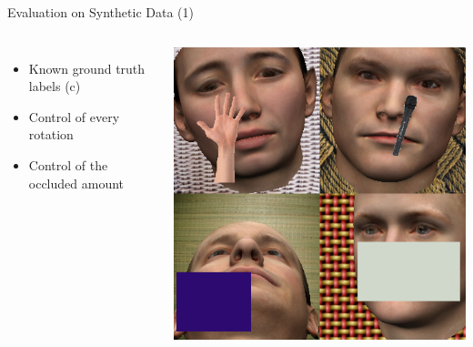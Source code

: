 \documentclass{beamer}
\begin{document}
\begin{frame}[c]{Evaluation on Synthetic Data (1)}
	\begin{columns}
		\begin{itemize}
			\item Known ground truth labels (c)
			\item Control of every rotation
			\item Control of the occluded amount
		\end{itemize}
			\includegraphics[width=\linewidth]{occlusionTypes/example.png}
	\end{columns}
	\vspace{-1em}
	\begin{figure}
		\centering
		\quad
		\quad

\end{figure}
\end{frame}
\end{document}
